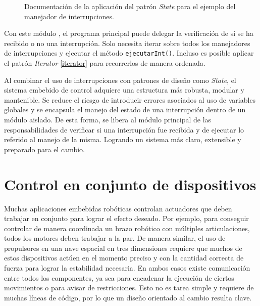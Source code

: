 \begin{figure}[H]
\caption{Documentación de la aplicación del patrón \textit{State} para el ejemplo del manejador de interrupciones.}
\label{docStateInt}
\end{figure}


Con este módulo \Manejador, el programa principal puede delegar la verificación de sí se ha recibido o no una interrupción. Solo necesita iterar sobre todos los manejadores de interrupciones y ejecutar el método \verb|ejecutarInt()|. Incluso es posible aplicar el patrón \textit{Iterator} \ref{iterator} para recorrerlos de manera ordenada.

Al combinar el uso de interrupciones con patrones de diseño como \textit{State}, el sistema embebido de control adquiere una estructura más robusta, modular y mantenible. Se reduce el riesgo de introducir errores asociados al uso de variables globales y se encapsula el manejo del estado de una interrupción dentro de un módulo aislado. De esta forma, se libera al módulo principal de las responsabilidades de verificar si una interrupción fue recibida y de ejecutar lo referido al manejo de la misma. Logrando un sistema más claro, extensible y preparado para el cambio.



\section{Control en conjunto de dispositivos}
Muchas aplicaciones embebidas robóticas controlan \gls{actuadores} que deben trabajar en conjunto para lograr el efecto deseado. Por ejemplo, para conseguir controlar de manera coordinada un brazo robótico con múltiples articulaciones, todos los motores deben trabajar a la par. De manera similar, el uso de propulsores en una nave espacial en tres dimensiones requiere que muchos de estos dispositivos actúen en el momento preciso y con la cantidad correcta de fuerza para lograr la estabilidad necesaria. En ambos casos existe comunicación entre todos los componentes, ya sea para encadenar la ejecución de ciertos movimientos o para avisar de restricciones. Esto no es tarea simple y requiere de muchas líneas de código, por lo que un diseño orientado al cambio resulta clave.

